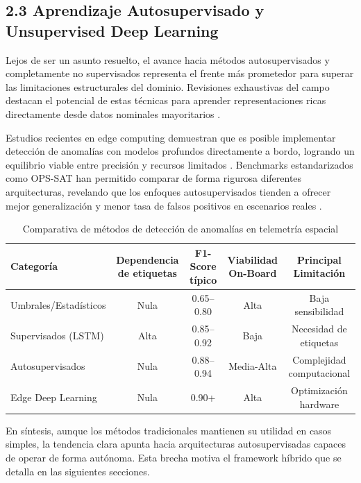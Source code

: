 \subsection{2.3 Aprendizaje Autosupervisado y Unsupervised Deep Learning}

Lejos de ser un asunto resuelto, el avance hacia métodos autosupervisados y completamente no supervisados representa el frente más prometedor para superar las limitaciones estructurales del dominio. Revisiones exhaustivas del campo destacan el potencial de estas técnicas para aprender representaciones ricas directamente desde datos nominales mayoritarios \cite{Fejjari2025_Review}.

Estudios recientes en edge computing demuestran que es posible implementar detección de anomalías con modelos profundos directamente a bordo, logrando un equilibrio viable entre precisión y recursos limitados \cite{Goetze2026_Edge}. Benchmarks estandarizados como OPS-SAT han permitido comparar de forma rigurosa diferentes arquitecturas, revelando que los enfoques autosupervisados tienden a ofrecer mejor generalización y menor tasa de falsos positivos en escenarios reales \cite{Ruszczak2025_OPSSAT}.

\begin{table}[h]
\centering
\caption{Comparativa de métodos de detección de anomalías en telemetría espacial}
\label{tab:methods_comparison}
\begin{tabular}{lcccc}
\toprule
Categoría & Dependencia de etiquetas & F1-Score típico & Viabilidad On-Board & Principal Limitación \\
\midrule
Umbrales/Estadísticos & Nula & 0.65--0.80 & Alta & Baja sensibilidad \\
Supervisados (LSTM) & Alta & 0.85--0.92 & Baja & Necesidad de etiquetas \\
Autosupervisados & Nula & 0.88--0.94 & Media-Alta & Complejidad computacional \\
Edge Deep Learning \cite{Goetze2026_Edge} & Nula & 0.90+ & Alta & Optimización hardware \\
\bottomrule
\end{tabular}
\end{table}

En síntesis, aunque los métodos tradicionales mantienen su utilidad en casos simples, la tendencia clara apunta hacia arquitecturas autosupervisadas capaces de operar de forma autónoma. Esta brecha motiva el framework híbrido que se detalla en las siguientes secciones.